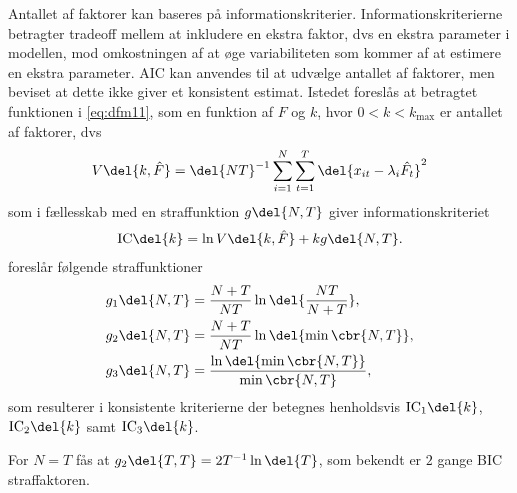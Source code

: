 Antallet af faktorer kan baseres på informationskriterier.
Informationskriterierne betragter tradeoff mellem at inkludere en ekstra faktor, dvs en ekstra parameter i modellen, mod omkostningen af at øge variabiliteten som kommer af at estimere en ekstra parameter.
AIC kan anvendes til at udvælge antallet af faktorer, men \citep{Bai_Ng} beviset at dette ikke giver et konsistent estimat.
Istedet foreslås at betragtet funktionen i \eqref{eq:dfm11}, som en funktion af \(F\) og \(k\), hvor \(0<k<k_\text{max}\) er antallet af faktorer, dvs
\begin{align*}
V \del{k, \hat{F}} = \del{NT}^{-1} \sum_{i=1}^N \sum_{t=1}^T \del{x_{it} -\lambda_i \hat{F_t}}^2
\end{align*}
som i fællesskab med en straffunktion \(g \del{N,T}\) giver informationskriteriet
\begin{align*}
\text{IC} \del{k} = \ln V \del{k, \hat{F}} + k g \del{N,T}.
\end{align*}
\citep{Bai_Ng} foreslår følgende straffunktioner
\begin{align*}
g_1 \del{N,T} &= \frac{N + T}{N T} \ln \del{\frac{NT}{N + T}}, \\
g_2 \del{N,T} &= \frac{N + T}{N T} \ln \del{ \min \cbr{N, T}}, \\
g_3 \del{N,T} &= \frac{\ln \del{\min \cbr{N, T}}}{\min \cbr{N, T}},
\end{align*}
som resulterer i konsistente kriterierne der betegnes henholdsvis \(\text{IC}_1 \del{k}\), \(\text{IC}_2 \del{k}\) samt \(\text{IC}_3 \del{k}\).

For \(N = T\) fås at \(g_2 \del{T,T} = 2T^{-1} \ln \del{T}\), som bekendt er \(2\) gange BIC straffaktoren.
%
